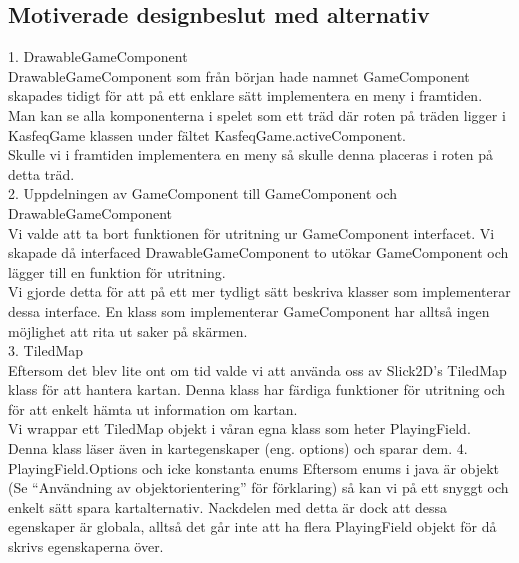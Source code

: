 \subsection{Motiverade designbeslut med alternativ}
1. DrawableGameComponent\\
DrawableGameComponent som från början hade namnet GameComponent skapades tidigt för att på ett enklare sätt implementera en meny i framtiden.\\
Man kan se alla komponenterna i spelet som ett träd där roten på träden ligger i KasfeqGame klassen under fältet KasfeqGame.activeComponent.\\
Skulle vi i framtiden implementera en meny så skulle denna placeras i roten på detta träd.\\
\vspace{11pt}
2. Uppdelningen av GameComponent till GameComponent och DrawableGameComponent\\
Vi valde att ta bort funktionen för utritning ur GameComponent interfacet. Vi skapade då interfaced DrawableGameComponent to utökar GameComponent och lägger till en funktion för utritning.\\
Vi gjorde detta för att på ett mer tydligt sätt beskriva klasser som implementerar dessa interface. En klass som implementerar GameComponent har alltså ingen möjlighet att rita ut saker på skärmen.\\
\vspace{11pt}
3. TiledMap\\
Eftersom det blev lite ont om tid valde vi att använda oss av Slick2D's TiledMap klass för att hantera kartan. Denna klass har färdiga funktioner för utritning och för att enkelt hämta ut information om kartan.\\
Vi wrappar ett TiledMap objekt i våran egna klass som heter PlayingField. Denna klass läser även in kartegenskaper (eng. options) och sparar dem.
\vspace{11pt}
4. PlayingField.Options och icke konstanta enums
Eftersom enums i java är objekt (Se ``Användning av objektorientering'' för förklaring) så kan vi på ett snyggt och enkelt sätt spara kartalternativ. Nackdelen med detta är dock att dessa egenskaper är globala, alltså det går inte att ha flera PlayingField objekt för då skrivs egenskaperna över.
